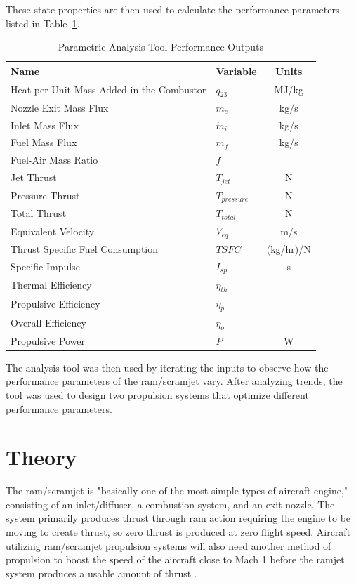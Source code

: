 \documentclass[conf]{new-aiaa} %
\begin{document}
These state properties are then used to calculate the performance parameters listed in Table~\ref{tab:perf_outputs}.

\begin{table}[hbt!] %
    \caption{\label{tab:perf_outputs} Parametric Analysis Tool Performance Outputs}
    \centering
    \begin{tabular}{llc}
        \hline
        Name& Variable& Units\\\hline
        Heat per Unit Mass Added in the Combustor& $q_{23}$& MJ/kg\\
        Nozzle Exit Mass Flux& $\dot m_e$& kg/s\\
        Inlet Mass Flux& $\dot m_i$& kg/s\\
        Fuel Mass Flux& $\dot m_f$& kg/s\\
        Fuel-Air Mass Ratio& $f$\\
        Jet Thrust& $T_{jet}$& N\\
        Pressure Thrust& $T_{pressure}$& N\\
        Total Thrust& $T_{total}$& N\\
        Equivalent Velocity& $V_{eq}$& m/s\\
        Thrust Specific Fuel Consumption& $TSFC$& (kg/hr)/N\\
        Specific Impulse& $I_{sp}$& s\\
        Thermal Efficiency& $\eta_{th}$\\
        Propulsive Efficiency& $\eta_p$\\
        Overall Efficiency& $\eta_o$\\
        Propulsive Power& $P$& W\\
        \hline
    \end{tabular}
\end{table}

The analysis tool was then used by iterating the inputs to observe how the performance parameters of the ram/scramjet vary. After analyzing trends, the tool was used to design two propulsion systems that optimize different performance parameters.


\section{Theory} \label{sec:theory}
The ram/scramjet is "basically one of the most simple types of aircraft engine," consisting of an inlet/diffuser, a combustion system, and an exit nozzle. The system primarily produces thrust through ram action requiring the engine to be moving to create thrust, so zero thrust is produced at zero flight speed. Aircraft utilizing ram/scramjet propulsion systems will also need another method of propulsion to boost the speed of the aircraft close to Mach 1 before the ramjet system produces a usable amount of thrust \cite{nasa1956ramjetperformance}.
\end{document}
